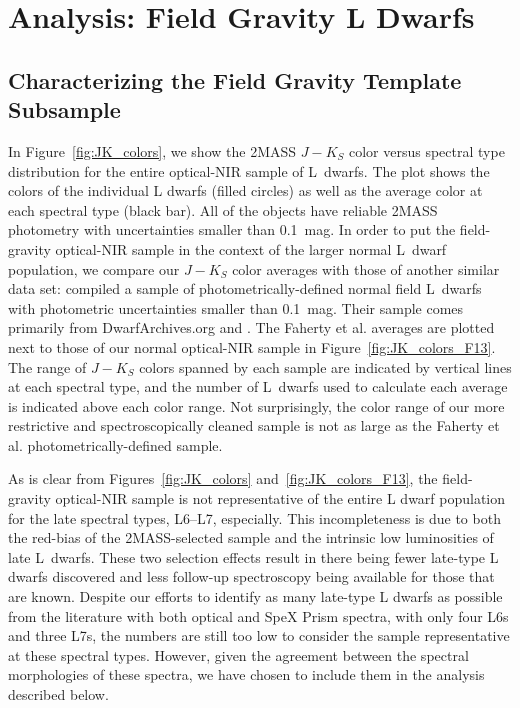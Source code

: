 \documentclass[12pt,preprint]{aastex}
\begin{document}

\section{Analysis: Field Gravity L Dwarfs}
\label{sec:fieldg}

\subsection{Characterizing the Field Gravity Template Subsample}
\label{sec:templates_normal}
 
In Figure~\ref{fig:JK_colors}, we show the 2MASS $J-K_S$ color versus spectral type distribution for the entire optical-NIR sample of L~dwarfs. The plot shows the colors of the individual L dwarfs (filled circles) as well as the average color at each spectral type (black bar). All of the objects have reliable 2MASS photometry with uncertainties smaller than 0.1~mag. In order to put the field-gravity optical-NIR sample in the context of the larger normal L~dwarf population, we compare our $J-K_S$ color averages with those of another similar data set: \citet{Faherty13_0355} compiled a sample of photometrically-defined normal field L~dwarfs with photometric uncertainties smaller than 0.1~mag. Their sample comes primarily from DwarfArchives.org and \cite{Schmidt10}. The Faherty et al. averages are plotted next to those of our normal optical-NIR sample in Figure~\ref{fig:JK_colors_F13}. The range of $J-K_S$ colors spanned by each sample are indicated by vertical lines at each spectral type, and the number of L~dwarfs used to calculate each average is indicated above each color range. Not surprisingly, the color range of our more restrictive and spectroscopically cleaned sample is not as large as the Faherty et al. photometrically-defined sample. 

As is clear from Figures~\ref{fig:JK_colors} and~\ref{fig:JK_colors_F13}, the field-gravity optical-NIR sample is not representative of the entire L dwarf population for the late spectral types, L6--L7, especially. 
This incompleteness is due to both the red-bias of the 2MASS-selected sample and the intrinsic low luminosities of late L~dwarfs.
These two selection effects result in there being fewer late-type L dwarfs discovered and less follow-up spectroscopy being available for those that are known.
Despite our efforts to identify as many late-type L dwarfs as possible from the literature with both optical and SpeX Prism spectra, with only four L6s and three L7s, the numbers are still too low to consider the sample representative at these spectral types.
However, given the agreement between the spectral morphologies of these spectra, we have chosen to include them in the analysis described below.
\end{document}
